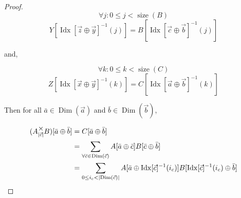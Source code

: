 \documentclass[12pt]{book}
\theoremstyle{plain}
\theoremstyle{definition}
\theoremstyle{ppart}
\theoremstyle{case}
\theoremstyle{solution}
\DeclareMathOperator{\Dim}{Dim}
\DeclareMathOperator{\Idx}{Idx}
\DeclareMathOperator{\size}{size}
\newcommand{\mmult}[1]{\text{\raisebox{1ex}{$\underset{#1}{\times}$}}}
\newcommand{\shape}[1]{\left|#1\right|}
\begin{document}
\begin{landscape}
\begin{proof}
\[\forall j : 0 \le j < \size(B)\]
\[ Y[\Idx[\vec{z} \oplus \vec{y}]^{-1}(j)] = B[\Idx[\vec{c} \oplus \vec{b}]^{-1}(j)] \]

and,

\[\forall k : 0 \le k < \size(C)\]
\[ Z[\Idx[\vec{x} \oplus \vec{y}]^{-1}(k)] = C[\Idx[\vec{a} \oplus \vec{b}]^{-1}(k)] \]

Then for all $\bar{a} \in \Dim(\vec{a})$ and $\bar{b} \in \Dim(\vec{b})$,

\begin{align*}
  (A \mmult{\shape{\vec{c}}} B)[\bar{a} \oplus \bar{b}]
  &= C[\bar{a} \oplus \bar{b}] \\
  &=
  \sum_{\forall \bar{c} \in \Dim(\vec{c})} A[\bar{a} \oplus \bar{c}] B[\bar{c} \oplus \bar{b}] \\
  &=
  \sum_{0 \le i_c < \shape{\Dim(\vec{c})}} A[\bar{a} \oplus \Idx[\vec{c}]^{-1}(i_c)] B[\Idx[\vec{c}]^{-1}(i_c) \oplus \bar{b}]
\end{align*}


\end{proof}
\end{landscape}
\end{document}
